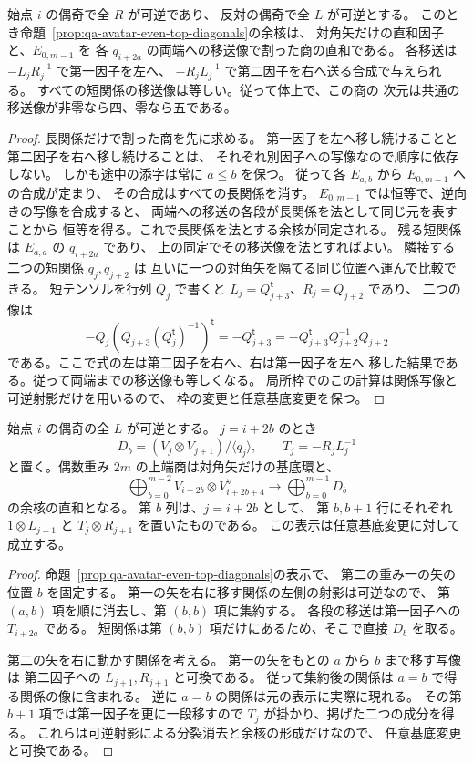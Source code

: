 \begin{corollary}[二つの重み一の矢を両端へ移す場合]
\label{cor:qa-avatar-even-top-outward}
始点 $i$ の偶奇で全 $R$ が可逆であり、
反対の偶奇で全 $L$ が可逆とする。
このとき命題~\ref{prop:qa-avatar-even-top-diagonals}の余核は、
対角矢だけの直和因子と、$E_{0,m-1}$ を
各 $q_{i+2a}$ の両端への移送像で割った商の直和である。
各移送は $-L_jR_j^{-1}$ で第一因子を左へ、
$-R_jL_j^{-1}$ で第二因子を右へ送る合成で与えられる。
すべての短関係の移送像は等しい。従って体上で、この商の
次元は共通の移送像が非零なら四、零なら五である。
\end{corollary}
\begin{proof}
長関係だけで割った商を先に求める。
第一因子を左へ移し続けることと第二因子を右へ移し続けることは、
それぞれ別因子への写像なので順序に依存しない。
しかも途中の添字は常に $a\le b$ を保つ。
従って各 $E_{a,b}$ から $E_{0,m-1}$ への合成が定まり、
その合成はすべての長関係を消す。
$E_{0,m-1}$ では恒等で、逆向きの写像を合成すると、
両端への移送の各段が長関係を法として同じ元を表すことから
恒等を得る。これで長関係を法とする余核が同定される。
残る短関係は $E_{a,a}$ の $q_{i+2a}$ であり、
上の同定でその移送像を法とすればよい。
隣接する二つの短関係 $q_j,q_{j+2}$ は
互いに一つの対角矢を隔てる同じ位置へ運んで比較できる。
短テンソルを行列 $Q_j$ で書くと
$L_j=Q_{j+3}^{\mathsf t}$、$R_j=Q_{j+2}$ であり、
二つの像は
\[
 -Q_j(Q_{j+3}(Q_j^{\mathsf t})^{-1})^{\mathsf t}
    =-Q_{j+3}^{\mathsf t}
    =-Q_{j+3}^{\mathsf t}Q_{j+2}^{-1}Q_{j+2}
\]
である。ここで式の左は第二因子を右へ、右は第一因子を左へ
移した結果である。従って両端までの移送像も等しくなる。
局所枠でのこの計算は関係写像と可逆射影だけを用いるので、
枠の変更と任意基底変更を保つ。
\end{proof}

\begin{corollary}[二つの重み一の矢を隣接させる場合]
\label{cor:qa-avatar-even-top-inward}
始点 $i$ の偶奇の全 $L$ が可逆とする。
$j=i+2b$ のとき
\[
 D_b=(V_j\otimes V_{j+1})/\langle q_j\rangle,
 \qquad T_j=-R_jL_j^{-1}
\]
と置く。偶数重み $2m$ の上端商は対角矢だけの基底環と、
\[
 \bigoplus_{b=0}^{m-2}V_{i+2b}\otimes V_{i+2b+4}^{\vee}
 \longrightarrow\bigoplus_{b=0}^{m-1} D_b
\]
の余核の直和となる。
第 $b$ 列は、$j=i+2b$ として、
第 $b,b+1$ 行にそれぞれ
$1\otimes L_{j+1}$ と $T_j\otimes R_{j+1}$ を置いたものである。
この表示は任意基底変更に対して成立する。
\end{corollary}
\begin{proof}
命題~\ref{prop:qa-avatar-even-top-diagonals}の表示で、
第二の重み一の矢の位置 $b$ を固定する。
第一の矢を右に移す関係の左側の射影は可逆なので、
第 $(a,b)$ 項を順に消去し、第 $(b,b)$ 項に集約する。
各段の移送は第一因子への $T_{i+2a}$ である。
短関係は第 $(b,b)$ 項だけにあるため、そこで直接 $D_b$ を取る。

第二の矢を右に動かす関係を考える。
第一の矢をもとの $a$ から $b$ まで移す写像は
第二因子への $L_{j+1},R_{j+1}$ と可換である。
従って集約後の関係は $a=b$ で得る関係の像に含まれる。
逆に $a=b$ の関係は元の表示に実際に現れる。
その第 $b+1$ 項では第一因子を更に一段移すので
$T_j$ が掛かり、掲げた二つの成分を得る。
これらは可逆射影による分裂消去と余核の形成だけなので、
任意基底変更と可換である。
\end{proof}

